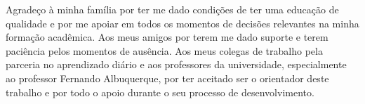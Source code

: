 Agradeço à minha família por ter me dado condições de ter uma educação de qualidade e por me apoiar em todos os momentos de decisões relevantes na minha formação acadêmica. Aos meus amigos por terem me dado suporte e terem paciência pelos momentos de ausência. Aos meus colegas de trabalho pela parceria no aprendizado diário e aos professores da universidade, especialmente ao professor Fernando Albuquerque, por ter aceitado ser o orientador deste trabalho e por todo o apoio durante o seu processo de desenvolvimento.